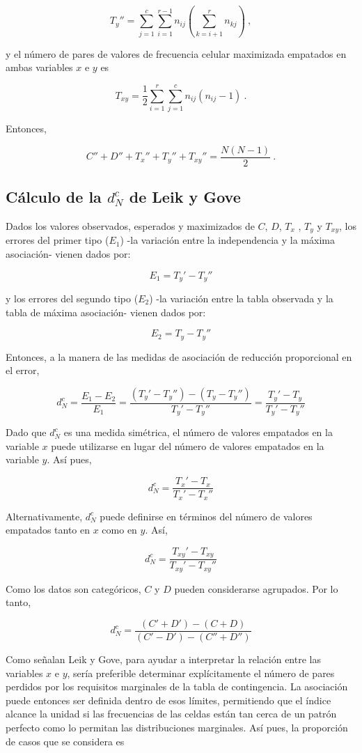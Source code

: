 \documentclass[12pt,a4paper,]{book}
\numberwithin{dummy}{section}
\theoremstyle{ocrenumbox}
\theoremstyle{blacknumex}
\theoremstyle{blacknumbox}
\theoremstyle{ocrenum}
\theoremstyle{ocrenum}
\begin{document}
\[
T_y''=\sum_{j=1}^{c}\sum_{i=1}^{r-1}n_{ij}(\sum_{k=i+1}^rn_{kj})~,
\]

y el número de pares de valores de frecuencia celular maximizada
empatados en ambas variables \(x\) e \(y\) es

\[
T_{xy}=\frac{1}{2}\sum_{i=1}^{r}\sum_{j=1}^{c}n_{ij}(n_{ij}-1)~.
\]

Entonces,

\[
C''+D''+T_x''+T_y''+T_{xy}''=\frac{N(N-1)}{2}~.
\]

\hypertarget{cuxe1lculo-de-la-d_nc-de-leik-y-gove}{%
\subsection{\texorpdfstring{Cálculo de la \(d_N^c\) de Leik y
Gove}{Cálculo de la d\_N\^{}c de Leik y Gove}}\label{cuxe1lculo-de-la-d_nc-de-leik-y-gove}}

Dados los valores observados, esperados y maximizados de \(C\), \(D\),
\(T_x\) , \(T_y\) y \(T_{xy}\), los errores del primer tipo (\(E_1\))
-la variación entre la independencia y la máxima asociación- vienen
dados por:

\[
E_1=T_y'-T_y''
\]

y los errores del segundo tipo (\(E_2\)) -la variación entre la tabla
observada y la tabla de máxima asociación- vienen dados por:

\[
E_2=T_y-T_y''
\]

Entonces, a la manera de las medidas de asociación de reducción
proporcional en el error,

\[
d_N^c=\frac{E_1-E_2}{E_1}=\frac{(T_y'-T_y'')-(T_y-T_y'')}{T_y'-T_y''}=\frac{T_y'-T_y}{T_y'-T_y''}
\]

Dado que \(d_N^c\) es una medida simétrica, el número de valores
empatados en la variable \(x\) puede utilizarse en lugar del número de
valores empatados en la variable \(y\). Así pues,

\[
d_N^c=\frac{T_x'-T_x}{T_x'-T_x''}
\]

Alternativamente, \(d_N^c\) puede definirse en términos del número de
valores empatados tanto en \(x\) como en \(y\). Así,

\[
d_N^c=\frac{T_{xy}'-T_{xy}}{T_{xy}'-T_{xy}''}
\]

Como los datos son categóricos, \(C\) y \(D\) pueden considerarse
agrupados. Por lo tanto,

\[
d_N^c=\frac{(C'+D')-(C+D)}{(C'-D')-(C''+D'')}
\]

Como señalan Leik y Gove, para ayudar a interpretar la relación entre
las variables \(x\) e \(y\), sería preferible determinar explícitamente
el número de pares perdidos por los requisitos marginales de la tabla de
contingencia. La asociación puede entonces ser definida dentro de esos
límites, permitiendo que el índice alcance la unidad si las frecuencias
de las celdas están tan cerca de un patrón perfecto como lo permitan las
distribuciones marginales. Así pues, la proporción de casos que se
considera es
\end{document}
